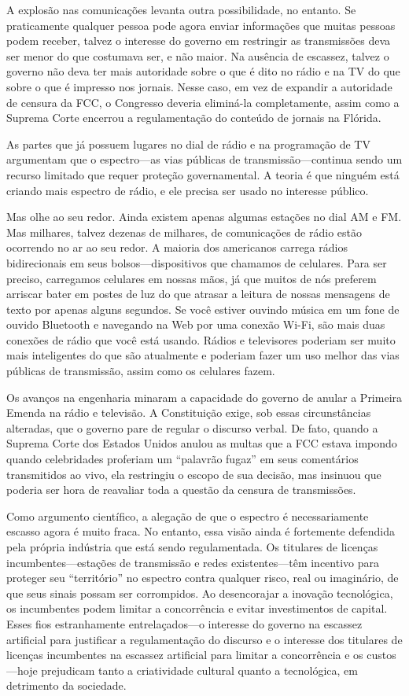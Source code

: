 \documentclass{book}
\begin{document}
A explosão nas comunicações levanta outra possibilidade, no entanto. Se
praticamente qualquer pessoa pode agora enviar informações que muitas pessoas
podem receber, talvez o interesse do governo em restringir as transmissões deva
ser menor do que costumava ser, e não maior. Na ausência de escassez, talvez o
governo não deva ter mais autoridade sobre o que é dito no rádio e na TV do que
sobre o que é impresso nos jornais. Nesse caso, em vez de expandir a autoridade
de censura da FCC, o Congresso deveria eliminá-la completamente, assim como a
Suprema Corte encerrou a regulamentação do conteúdo de jornais na Flórida.

As partes que já possuem lugares no dial de rádio e na programação de TV
argumentam que o espectro---as vias públicas de transmissão---continua sendo um
recurso limitado que requer proteção governamental. A teoria é que ninguém está
criando mais espectro de rádio, e ele precisa ser usado no interesse público.

Mas olhe ao seu redor. Ainda existem apenas algumas estações no dial AM e FM.
Mas milhares, talvez dezenas de milhares, de comunicações de rádio estão
ocorrendo no ar ao seu redor. A maioria dos americanos carrega rádios
bidirecionais em seus bolsos---dispositivos que chamamos de celulares. Para ser
preciso, carregamos celulares em nossas mãos, já que muitos de nós preferem
arriscar bater em postes de luz do que atrasar a leitura de nossas mensagens de
texto por apenas alguns segundos. Se você estiver ouvindo música em um fone de
ouvido Bluetooth e navegando na Web por uma conexão Wi-Fi, são mais duas conexões
de rádio que você está usando. Rádios e televisores poderiam ser muito mais
inteligentes do que são atualmente e poderiam fazer um uso melhor das vias
públicas de transmissão, assim como os celulares fazem.

Os avanços na engenharia minaram a capacidade do governo de anular a Primeira
Emenda na rádio e televisão. A Constituição exige, sob essas circunstâncias
alteradas, que o governo pare de regular o discurso verbal. De fato, quando a
Suprema Corte dos Estados Unidos anulou as multas que a FCC estava impondo quando
celebridades proferiam um ``palavrão fugaz'' em seus comentários transmitidos ao
vivo, ela restringiu o escopo de sua decisão, mas insinuou que poderia ser hora
de reavaliar toda a questão da censura de transmissões.

Como argumento científico, a alegação de que o espectro é necessariamente escasso
agora é muito fraca. No entanto, essa visão ainda é fortemente defendida pela
própria indústria que está sendo regulamentada. Os titulares de licenças
incumbentes---estações de transmissão e redes existentes---têm incentivo para
proteger seu ``território'' no espectro contra qualquer risco, real ou imaginário,
de que seus sinais possam ser corrompidos. Ao desencorajar a inovação tecnológica,
os incumbentes podem limitar a concorrência e evitar investimentos de capital.
Esses fios estranhamente entrelaçados---o interesse do governo na escassez
artificial para justificar a regulamentação do discurso e o interesse dos
titulares de licenças incumbentes na escassez artificial para limitar a
concorrência e os custos---hoje prejudicam tanto a criatividade cultural quanto
a tecnológica, em detrimento da sociedade.
\end{document}
